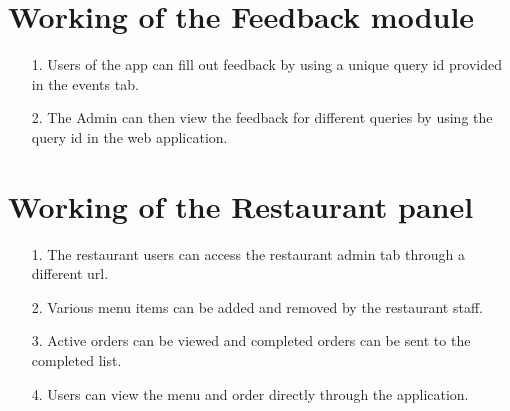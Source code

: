     \section{Working of the Feedback module}
\begin{itemize}
\item[1.]Users of the app can fill out feedback by using a unique query id provided in the events tab.
\item[2.]The Admin can then view the feedback for different queries by using the query id in the web application.
\end{itemize}

    

    \section{Working of the Restaurant panel}
\begin{itemize}
\item[1.]The restaurant users can access the restaurant admin tab through a different url.
\item[2.]Various menu items can be added and removed by the restaurant staff.
\item[3.]Active orders can be viewed and completed orders can be sent to the completed list.
\item[4.]Users can view the menu and order directly through the application.
\end{itemize}




    
    











